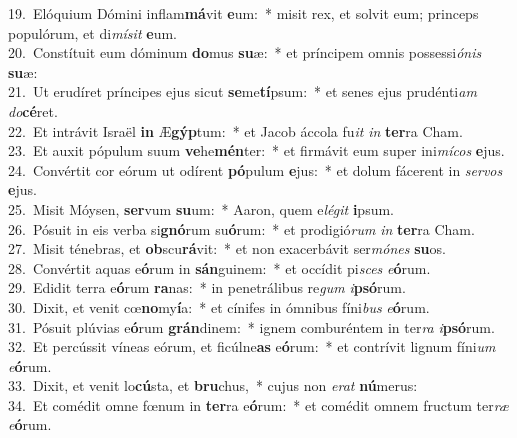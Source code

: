 {19.~}Elóquium Dómini inflam\textbf{má}vit \textbf{e}um:~* misit rex, et solvit eum; princeps populórum, et di\textit{mí}\textit{sit} \textbf{e}um.\\
{20.~}Constítuit eum dóminum \textbf{do}mus \textbf{su}æ:~* et príncipem omnis possessi\textit{ó}\textit{nis} \textbf{su}æ:\\
{21.~}Ut erudíret príncipes ejus sicut \textbf{se}me\textbf{tí}psum:~* et senes ejus prudénti\textit{am} \textit{do}\textbf{cé}ret.\\
{22.~}Et intrávit Israël \textbf{in} Æ\textbf{gýp}tum:~* et Jacob áccola fu\textit{it} \textit{in} \textbf{ter}ra Cham.\\
{23.~}Et auxit pópulum suum \textbf{ve}he\textbf{mén}ter:~* et firmávit eum super ini\textit{mí}\textit{cos} \textbf{e}jus.\\
{24.~}Convértit cor eórum ut odírent \textbf{pó}pulum \textbf{e}jus:~* et dolum fácerent in \textit{ser}\textit{vos} \textbf{e}jus.\\
{25.~}Misit Móysen, \textbf{ser}vum \textbf{su}um:~* Aaron, quem e\textit{lé}\textit{git} \textbf{i}psum.\\
{26.~}Pósuit in eis verba si\textbf{gnó}rum su\textbf{ó}rum:~* et prodigió\textit{rum} \textit{in} \textbf{ter}ra Cham.\\
{27.~}Misit ténebras, et \textbf{ob}scu\textbf{rá}vit:~* et non exacerbávit ser\textit{mó}\textit{nes} \textbf{su}os.\\
{28.~}Convértit aquas e\textbf{ó}rum in \textbf{sán}guinem:~* et occídit pi\textit{sces} \textit{e}\textbf{ó}rum.\\
{29.~}Edidit terra e\textbf{ó}rum \textbf{ra}nas:~* in penetrálibus re\textit{gum} \textit{i}\textbf{psó}rum.\\
{30.~}Dixit, et venit cœ\textbf{no}my\textbf{í}a:~* et cínifes in ómnibus fíni\textit{bus} \textit{e}\textbf{ó}rum.\\
{31.~}Pósuit plúvias e\textbf{ó}rum \textbf{grán}dinem:~* ignem comburéntem in ter\textit{ra} \textit{i}\textbf{psó}rum.\\
{32.~}Et percússit víneas eórum, et ficúlne\textbf{as} e\textbf{ó}rum:~* et contrívit lignum fíni\textit{um} \textit{e}\textbf{ó}rum.\\
{33.~}Dixit, et venit lo\textbf{cú}sta, et \textbf{bru}chus,~* cujus non \textit{e}\textit{rat} \textbf{nú}merus:\\
{34.~}Et comédit omne fœnum in \textbf{ter}ra e\textbf{ó}rum:~* et comédit omnem fructum ter\textit{ræ} \textit{e}\textbf{ó}rum.\\
